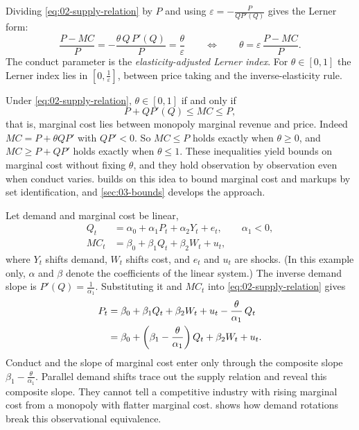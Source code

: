 Dividing \eqref{eq:02-supply-relation} by $P$ and using $\varepsilon = -\frac{P}{Q P'(Q)}$ gives the Lerner form:
\begin{equation}\label{eq:02-theta-lerner}
\frac{P - MC}{P} = -\frac{\theta\, Q\, P'(Q)}{P} = \frac{\theta}{\varepsilon}
\qquad\Longleftrightarrow\qquad
\theta = \varepsilon\,\frac{P - MC}{P} .
\end{equation}
The conduct parameter is the \emph{elasticity-adjusted Lerner index}. For $\theta \in [0, 1]$ the Lerner index lies
in $\left[0, \frac{1}{\varepsilon}\right]$, between price taking and the inverse-elasticity rule.

\begin{remark}\label{rem:02-theta-bounds}
Under \eqref{eq:02-supply-relation}, $\theta \in [0, 1]$ if and only if
\begin{equation*}
P + Q P'(Q) \le MC \le P ,
\end{equation*}
that is, marginal cost lies between monopoly marginal revenue and price. Indeed $MC = P + \theta Q P'$ with
$QP' < 0$. So $MC \le P$ holds exactly when $\theta \ge 0$, and $MC \ge P + QP'$ holds exactly when $\theta \le 1$.
These inequalities yield bounds on marginal cost without fixing $\theta$, and they hold observation by observation
even when conduct varies. \citet{Rosen2007} builds on this idea to bound marginal cost and markups by set
identification, and \cref{sec:03-bounds} develops the approach.
\end{remark}

\begin{example}\label{ex:02-linear-system}
Let demand and marginal cost be linear,
\begin{align*}
Q_t &= \alpha_0 + \alpha_1 P_t + \alpha_2 Y_t + e_t , \qquad \alpha_1 < 0, \\
MC_t &= \beta_0 + \beta_1 Q_t + \beta_2 W_t + u_t ,
\end{align*}
where $Y_t$ shifts demand, $W_t$ shifts cost, and $e_t$ and $u_t$ are shocks. (In this example only, $\alpha$ and
$\beta$ denote the coefficients of the linear system.) The inverse demand slope is
$P'(Q) = \frac{1}{\alpha_1}$. Substituting it and $MC_t$ into \eqref{eq:02-supply-relation} gives
\begin{align}
P_t &= \beta_0 + \beta_1 Q_t + \beta_2 W_t + u_t - \frac{\theta}{\alpha_1}\, Q_t \notag \\
&= \beta_0 + \left(\beta_1 - \frac{\theta}{\alpha_1}\right) Q_t + \beta_2 W_t + u_t . \label{eq:02-linear-supply}
\end{align}
Conduct and the slope of marginal cost enter only through the composite slope
$\beta_1 - \frac{\theta}{\alpha_1}$. Parallel demand shifts trace out the supply relation and reveal this composite
slope. They cannot tell a competitive industry with rising marginal cost from a monopoly with flatter marginal
cost.  shows how demand rotations \citep{Bresnahan1982,Lau1982} break this observational
equivalence.
\end{example}

